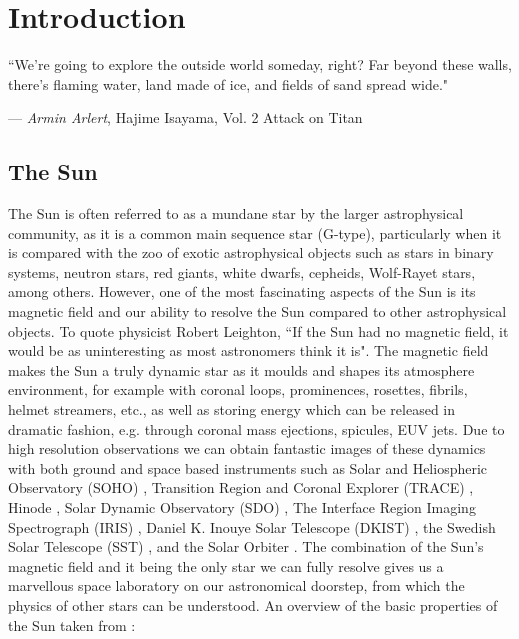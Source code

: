 \chapter{Introduction}
\label{chap:intro}
\epigraph{``We're going to explore the outside world someday, right? Far beyond these walls, there's flaming water, land made of ice, and fields of sand spread wide."}{--- \textit{Armin Arlert}, \textup{Hajime Isayama}, Vol. 2  Attack on Titan}
\section{The Sun}
\label{sec:Sun}
The Sun is often referred to as a mundane star by the larger astrophysical community, as it is a common main sequence star (G-type), particularly when it is compared with the zoo of exotic astrophysical objects such as stars in binary systems, neutron stars, red giants, white dwarfs, cepheids, Wolf-Rayet stars, among others. However, one of the most fascinating aspects of the Sun is its magnetic field and our ability to resolve the Sun compared to other astrophysical objects. To quote physicist Robert Leighton, ``If the Sun had no magnetic field, it would be as uninteresting as most astronomers think it is". The magnetic field makes the Sun a truly dynamic star as it moulds and shapes its atmosphere environment, for example with coronal loops, prominences, rosettes, fibrils, helmet streamers, etc., as well as storing energy which can be released in dramatic fashion, e.g. through coronal mass ejections, spicules, EUV jets. Due to high resolution observations we can obtain fantastic images of these dynamics with both ground and space based instruments such as Solar and Heliospheric Observatory (SOHO) \citep{Domingo1995SSRv7281D}, Transition Region and Coronal Explorer (TRACE) \citep{Tarbell1994ESASP373375T}, Hinode \citep{Tsuneta2008SoPh,Suematsu2008SoPh,Ichimoto2008SoPh}, Solar Dynamic Observatory (SDO) \citep{Lemen2012SoPh27517L}, The Interface Region Imaging Spectrograph (IRIS) \citep{Pontieu2013SPD4403D}, Daniel K. Inouye Solar Telescope (DKIST) \citep{Rast2020arXiv,Rimmele2020SoPh}, the Swedish Solar Telescope (SST) \citep{Scharmer2003SPIE}, and the Solar Orbiter \citep{sol_orb_2013SPIE8862E0EM}. The combination of the Sun's magnetic field and it being the only star we can fully resolve gives us a marvellous space laboratory on our astronomical doorstep, from which the physics of other stars can be understood. An overview of the basic properties of the Sun taken from \cite{priest2014magnetohydrodynamics}:

